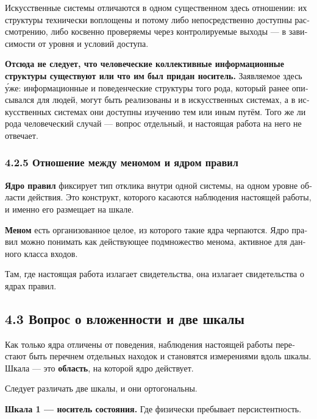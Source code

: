 \begin{russian}
Искусственные системы отличаются в одном существенном здесь отношении: их структуры технически воплощены и потому либо непосредственно доступны рассмотрению, либо косвенно проверяемы через контролируемые выходы — в зависимости от уровня и условий доступа.

\textbf{Отсюда не следует, что человеческие коллективные информационные структуры существуют или что им был придан носитель.} Заявляемое здесь у́же: информационные и поведенческие структуры того рода, который ранее описывался для людей, могут быть реализованы и в искусственных системах, а в искусственных системах они доступны изучению тем или иным путём. Того же ли рода человеческий случай — вопрос отдельный, и настоящая работа на него не отвечает.


\subsubsection*{4.2.5 Отношение между меномом и ядром правил}
\label{sec:ru:4.2.5}

\textbf{Ядро правил} фиксирует тип отклика внутри одной системы, на одном уровне области действия. Это конструкт, которого касаются наблюдения настоящей работы, и именно его  размещает на шкале.

\textbf{Меном} есть организованное целое, из которого такие ядра черпаются. Ядро правил можно понимать как действующее подмножество менома, активное для данного класса входов.

Там, где настоящая работа излагает свидетельства, она излагает свидетельства о ядрах правил.


\subsection*{4.3 Вопрос о вложенности и две шкалы}
\label{sec:ru:4.3}

Как только ядра отличены от поведения, наблюдения настоящей работы перестают быть перечнем отдельных находок и становятся измерениями вдоль шкалы. Шкала — это \textbf{область}, на которой ядро действует.

Следует различать две шкалы, и они ортогональны.

\textbf{Шкала 1 — носитель состояния.} Где физически пребывает персистентность.


\end{russian}
